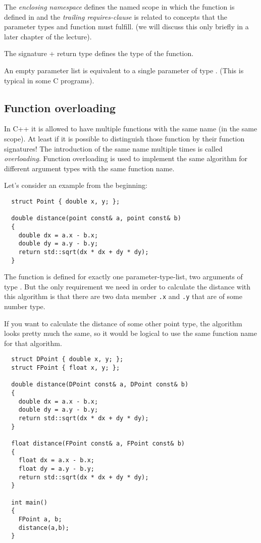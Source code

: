 The \emph{enclosing namespace} defines the named scope in which the function is defined in and the \emph{trailing requires-clause} is related
to concepts that the parameter types and function must fulfill. (we will discuss this only briefly in a later chapter of the lecture).

The signature + return type defines the type of the function.

\begin{rem}
  An empty parameter list is equivalent to a single parameter of type . (This is typical in some C programs).
\end{rem}


\subsection{Function overloading\label{sec:function-overloading}}
In C++ it is allowed to have multiple functions with the same name (in the same scope). At least if it is possible to distinguish those function by
their function signatures! The introduction of the same name multiple times is called \emph{overloading}. Function overloading is used to implement
the same algorithm for different argument types with the same function name.

\begin{example}
Let's consider an example from the beginning:
%
\begin{verbatim}
  struct Point { double x, y; };

  double distance(point const& a, point const& b)
  {
    double dx = a.x - b.x;
    double dy = a.y - b.y;
    return std::sqrt(dx * dx + dy * dy);
  }
\end{verbatim}
%
The function  is defined for exactly one parameter-type-list, \ie two arguments of type . But the only requirement we need
in order to calculate the distance with this algorithm is that there are two data member \texttt{.x} and \texttt{.y} that are of some number type.

If you want to calculate the distance of some other point type, the algorithm looks pretty much the same, so it would be logical to use the same function
name for that algorithm.
%
\begin{verbatim}
  struct DPoint { double x, y; };
  struct FPoint { float x, y; };

  double distance(DPoint const& a, DPoint const& b)
  {
    double dx = a.x - b.x;
    double dy = a.y - b.y;
    return std::sqrt(dx * dx + dy * dy);
  }

  float distance(FPoint const& a, FPoint const& b)
  {
    float dx = a.x - b.x;
    float dy = a.y - b.y;
    return std::sqrt(dx * dx + dy * dy);
  }

  int main()
  {
    FPoint a, b;
    distance(a,b);
  }
\end{verbatim}
\end{example}

